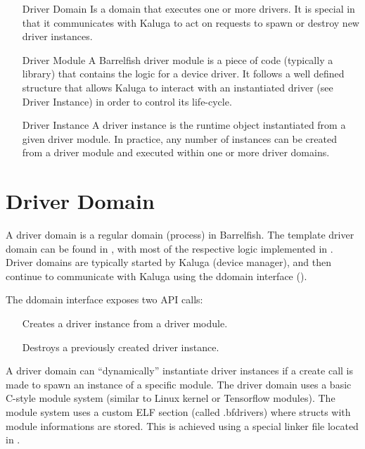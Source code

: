 \documentclass[a4paper,11pt,twoside]{report}
\begin{document}
\begin{itemize}
    \item[Driver Domain] Is a domain that executes one or more drivers. It is
    special in that it communicates with Kaluga to act on requests to
    spawn or destroy new driver instances.

    \item[Driver Module] A Barrelfish driver module is a piece of code
    (typically a library) that contains the logic for a device driver.
    It follows a well defined structure that allows Kaluga to interact with an
    instantiated driver (see Driver Instance) in order to control its
    life-cycle.

    \item[Driver Instance] A driver instance is the runtime object instantiated from a
    given driver module. In practice, any number of instances can be created
    from a driver module and executed within one or more driver domains.
\end{itemize}

\section{Driver Domain}
\label{sec:domain}

A driver domain is a regular domain (process) in Barrelfish. The template driver
domain can be found in , with most of the
respective logic implemented in . Driver domains are
typically started by Kaluga (device manager), and then continue to communicate
with Kaluga using the ddomain interface ().

The ddomain interface exposes two API calls:
\begin{itemize}
    \item[\fnname{create}] Creates a driver instance from a driver module.
    \item[\fnname{destroy}] Destroys a previously created driver instance.
\end{itemize}

A driver domain can ``dynamically'' instantiate driver instances if a create call
is made to spawn an instance of a specific module. The driver domain uses a
basic C-style module system (similar to Linux kernel or Tensorflow modules). The
module system uses a custom ELF section (called .bfdrivers) where structs with
module informations are stored. This is achieved using a special linker file
located in .
\end{document}
